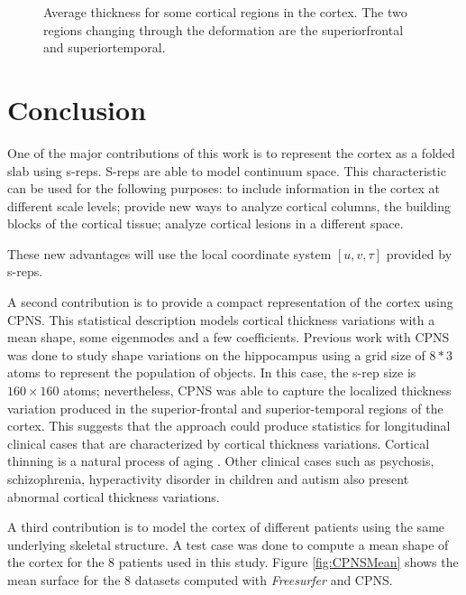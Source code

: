 \begin{figure}[htb] 
  \centering
  \caption[Average thickness of the cortex.]{Average thickness for some cortical regions in the cortex. The two regions changing through the deformation
           are the superiorfrontal and superiortemporal.}
  \label{fig:thickness}   
\end{figure}


\section{Conclusion}
\label{sec:Conclusion}

One of the major contributions of this work is to represent the cortex as a folded slab using s-reps. 
S-reps are able to model continuum space. This characteristic can be used 
for the following purposes:
to include information in the cortex at different scale levels; provide 
new ways to analyze cortical columns, the building blocks of the cortical tissue;
analyze cortical lesions in a different space. 

These new advantages will use the local coordinate system $[u,v,\tau]$ provided by s-reps. 

A second contribution is to provide a compact representation of the cortex using CPNS. 
This statistical description models cortical thickness variations with a mean shape, some eigenmodes and a few coefficients.
Previous work with CPNS was done to study shape variations on the hippocampus using a grid size of $8*3$ atoms 
to represent the population of objects.
In this case, the s-rep size is $160 \times 160 $ atoms; nevertheless, CPNS was able to capture the localized thickness variation produced 
in the superior-frontal and superior-temporal regions of the cortex. 
This suggests that the approach could
produce statistics for longitudinal clinical 
cases that are characterized by cortical thickness variations. 
Cortical thinning is a natural process of aging \cite{doi:10.1080/13803390802635174}.
Other clinical cases such as psychosis, schizophrenia, hyperactivity disorder in children and autism
also present abnormal cortical thickness variations.

A third contribution is to model the cortex of different patients using the same underlying skeletal structure.
A test case was done to compute a mean shape of the cortex for the 8 patients used in this study. 
Figure \ref{fig:CPNSMean} shows the mean surface for the 8 datasets computed with \textit{Freesurfer} and
CPNS. 

